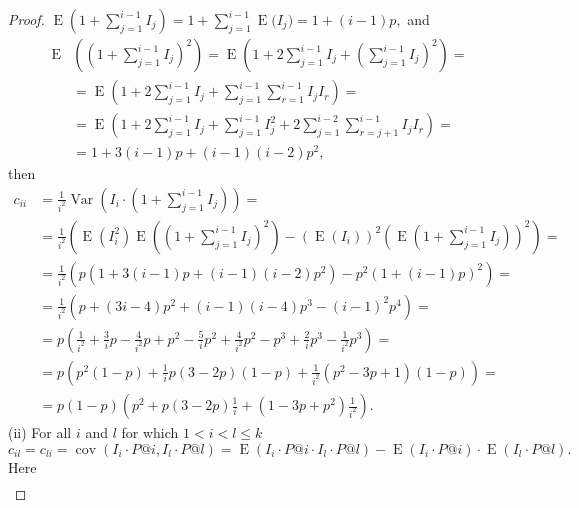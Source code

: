 \documentclass{tpms-l}
\theoremstyle{definition}
\theoremstyle{remark}
\numberwithin{equation}{section}
\begin{document}
\begin{proof}
$\operatorname{E}\left(1 + \sum_{j=1}^{i-1} I_j\right) = 1 + \sum_{j=1}^{i-1} \operatorname{E}\big(I_j\big) = 1 + (i-1)p,$
and
\begin{equation*}
\begin{split}
\operatorname{E}&\left( \left( 1 + \sum_{j=1}^{i-1} I_j \right)^2 \right) =
\operatorname{E}\left( 1 + 2\sum_{j=1}^{i-1} I_j + \left( \sum_{j=1}^{i-1} I_j \right)^2 \right) =\\
&= \operatorname{E}\left( 1 + 2\sum_{j=1}^{i-1} I_j + \sum_{j=1}^{i-1} \sum_{r=1}^{i-1} I_j I_r \right) =\\
&= \operatorname{E}\left( 1 + 2\sum_{j=1}^{i-1} I_j + \sum_{j=1}^{i-1} I_j^2 + 2 \sum_{j=1}^{i-2} \sum_{r=j+1}^{i-1} I_j I_r \right) =\\
&= 1 + 3(i-1)p + (i-1)(i-2)p^2,
\end{split}
\end{equation*}
then
\begin{equation*}
\begin{split}
c_{ii}& = \frac{1}{i^2} \operatorname{Var} \left( I_i \cdot \left(1 + \sum_{j=1}^{i-1} I_j \right)\right) =\\
&= \frac{1}{i^2} \left( \operatorname{E} \left( I_i^2 \right) \operatorname{E}\left( \left(1 + \sum_{j=1}^{i-1} I_j \right)^2 \right) - \left( \operatorname{E}(I_i) \right)^2 \left(\operatorname{E} \left( 1 + \sum_{j=1}^{i-1} I_j \right) \right)^2 \right)=\\
& = \frac{1}{i^2} \left( p \left(1 + 3(i-1)p + (i-1)(i-2)p^2 \right) - p^2 \left(1 + (i-1)p \right)^2 \right)=\\
& = \frac{1}{i^2} \left( p + (3i-4)p^2 + (i-1)(i-4)p^3 - (i-1)^2p^4 \right)=\\
& = p \left( \frac{1}{i^2} + \frac{3}{i}p - \frac{4}{i^2}p + p^2 - \frac{5}{i}p^2 + \frac{4}{i^2}p^2 - p^3 + \frac{2}{i}p^3 - \frac{1}{i^2}p^3 \right)=
\\
& = p\left( p^2(1-p) + \frac{1}{i}p(3-2p)(1-p) + \frac{1}{i^2}(p^2 - 3p + 1)(1-p) \right)=
\\
& = p(1-p) \left( p^2 + p(3-2p)\frac{1}{i} + (1-3p+p^2)\frac{1}{i^2} \right).
\end{split}
\end{equation*}
(ii)  For all $i$ and $l$ for which $1<i<l\leq k$
$$c_{il} = c_{li} = \operatorname{cov}(I_i \cdot P@i, I_l \cdot P@l) = \operatorname{E}(I_i \cdot P@i \cdot I_l \cdot P@l) - \operatorname{E}(I_i \cdot P@i) \cdot \operatorname{E}(I_l \cdot P@l).$$
Here
\begin{equation*}
\begin{split}

\end{split}
\end{equation*}
\end{proof}
\end{document}
